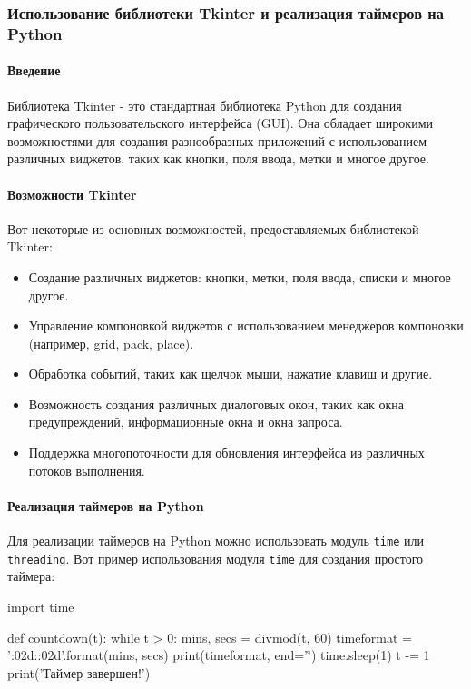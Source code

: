 \subsubsection{Использование библиотеки Tkinter и реализация таймеров на Python}
	
\paragraph{Введение}
Библиотека Tkinter - это стандартная библиотека Python для создания графического пользовательского интерфейса (GUI). Она обладает широкими возможностями для создания разнообразных приложений с использованием различных виджетов, таких как кнопки, поля ввода, метки и многое другое.
	
\paragraph{Возможности Tkinter}
Вот некоторые из основных возможностей, предоставляемых библиотекой Tkinter:
	
\begin{itemize}
	\item Создание различных виджетов: кнопки, метки, поля ввода, списки и многое другое.
	\item Управление компоновкой виджетов с использованием менеджеров компоновки (например, grid, pack, place).
	\item Обработка событий, таких как щелчок мыши, нажатие клавиш и другие.
	\item Возможность создания различных диалоговых окон, таких как окна предупреждений, информационные окна и окна запроса.
	\item Поддержка многопоточности для обновления интерфейса из различных потоков выполнения.
\end{itemize}
	
\paragraph{Реализация таймеров на Python}
Для реализации таймеров на Python можно использовать модуль \texttt{time} или \texttt{threading}. Вот пример использования модуля \texttt{time} для создания простого таймера:
	
	import time
	
	def countdown(t):
	while t > 0:
	mins, secs = divmod(t, 60)
	timeformat = '{:02d}:{:02d}'.format(mins, secs)
	print(timeformat, end='\r')
	time.sleep(1)
	t -= 1
	print('Таймер завершен!')
	

